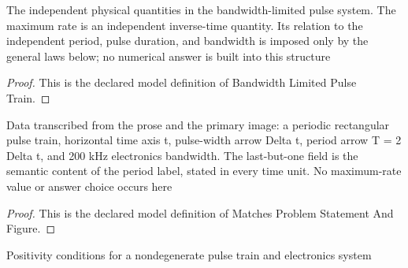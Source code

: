 \begin{definition}
  \label{def:physics:phyx-mini-0504:phyxminiproblems-problemphyxmini0504-bandwidthlimitedpulsetrain}
  The independent physical quantities in the bandwidth-limited pulse system. The maximum rate is an independent inverse-time quantity. Its relation to the independent period, pulse duration, and bandwidth is imposed only by the general laws below; no numerical answer is built into this structure
\end{definition}
\begin{proof}
  This is the declared model definition of Bandwidth Limited Pulse Train.
\end{proof}
\begin{definition}
  \label{def:physics:phyx-mini-0504:phyxminiproblems-problemphyxmini0504-matchesproblemstatementandfigure}
  Data transcribed from the prose and the primary image: a periodic rectangular pulse train, horizontal time axis t, pulse-width arrow Delta t, period arrow T = 2 Delta t, and 200 kHz electronics bandwidth. The last-but-one field is the semantic content of the period label, stated in every time unit. No maximum-rate value or answer choice occurs here
\end{definition}
\begin{proof}
  This is the declared model definition of Matches Problem Statement And Figure.
\end{proof}
\begin{definition}
  \label{def:physics:phyx-mini-0504:phyxminiproblems-problemphyxmini0504-hasphysicalpulsetrainparameters}
  Positivity conditions for a nondegenerate pulse train and electronics system
\end{definition}
